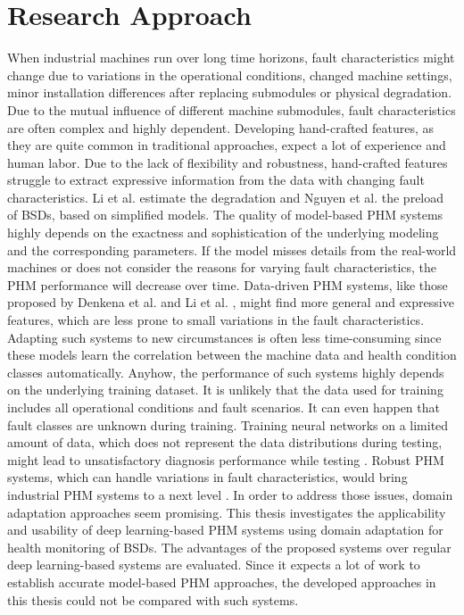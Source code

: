 \chapter{Research Approach}\label{chapter:research_approach}

When industrial machines run over long time horizons, fault characteristics might change due to variations in the operational conditions, changed machine settings, minor installation differences after replacing submodules or physical degradation. Due to the mutual influence of different machine submodules, fault characteristics are often complex and highly dependent. Developing hand-crafted features, as they are quite common in traditional approaches, expect a lot of experience and human labor. Due to the lack of flexibility and robustness, hand-crafted features struggle to extract expressive information from the data with changing fault characteristics. Li et al. \cite{Lee2015} estimate the degradation and Nguyen et al. \cite{NGUYEN2019} the preload of BSDs, based on simplified models. The quality of model-based PHM systems highly depends on the exactness and sophistication of the underlying modeling and the corresponding parameters. If the model misses details from the real-world machines or does not consider the reasons for varying fault characteristics, the PHM performance will decrease over time. Data-driven PHM systems, like those proposed by Denkena et al. \cite{Denkena2021} and Li et al. \cite{LiPin2018}, might find more general and expressive features, which are less prone to small variations in the fault characteristics. Adapting such systems to new circumstances is often less time-consuming since these models learn the correlation between the machine data and health condition classes automatically. Anyhow, the performance of such systems highly depends on the underlying training dataset. It is unlikely that the data used for training includes all operational conditions and fault scenarios. It can even happen that fault classes are unknown during training. Training neural networks on a limited amount of data, which does not represent the data distributions during testing, might lead to unsatisfactory diagnosis performance while testing \cite{AZAMFAR2020103932}. Robust PHM systems, which can handle variations in fault characteristics, would bring industrial PHM systems to a next level \cite{Michau2017}. In order to address those issues, domain adaptation approaches seem promising. This thesis investigates the applicability and usability of deep learning-based PHM systems using domain adaptation for health monitoring of BSDs. The advantages of the proposed systems over regular deep learning-based systems are evaluated. Since it expects a lot of work to establish accurate model-based PHM approaches, the developed approaches in this thesis could not be compared with such systems.

